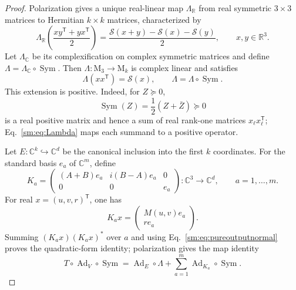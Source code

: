 \documentclass[aps,prl,reprint,superscriptaddress,nofootinbib]{revtex4-2}
\newcommand{\M}{\mathrm{M}}
\newcommand{\C}{\mathbb C}
\newcommand{\Ad}{\operatorname{Ad}}
\newcommand{\Sym}{\operatorname{Sym}}
\newcommand{\cS}{\mathcal S}
\begin{document}
\begin{proof}
Polarization gives a unique real-linear map \(\Lambda_{\mathbb R}\) from
real symmetric \(3\times3\) matrices to Hermitian \(k\times k\) matrices,
characterized by
\begin{equation*}
 \Lambda_{\mathbb R}\!\left(\frac{xy^{\mathsf T}+yx^{\mathsf T}}{2}\right)
 =\frac{\cS(x+y)-\cS(x)-\cS(y)}{2},
 \qquad x,y\in\mathbb R^3.
\end{equation*}
Let \(\Lambda_{\mathbb C}\) be its complexification on complex symmetric
matrices and define \(\Lambda=\Lambda_{\mathbb C}\circ\Sym\).  Then
\(\Lambda:\M_3\to\M_k\) is complex linear and satisfies
\begin{equation}
 \Lambda(xx^{\mathsf T})=\cS(x),\qquad
 \Lambda=\Lambda\circ\Sym.
\label{sm:eq:Lambda}
\end{equation}
This extension is positive.  Indeed, for \(Z\succeq0\),
\begin{equation}
 \Sym(Z)=\frac12(Z+\bar Z)\succeq0
\label{sm:eq:sympositive}
\end{equation}
is a real positive matrix and hence a sum of real rank-one matrices
\(x_\ell x_\ell^{\mathsf T}\); Eq.~\eqref{sm:eq:Lambda} maps each summand
to a positive operator.

Let \(E:\C^k\hookrightarrow\C^d\) be the canonical inclusion into the first
$k$ coordinates.
For the standard basis \(e_a\) of \(\C^m\), define
\begin{equation}
 K_a=\begin{pmatrix}
 (A+B)e_a&i(B-A)e_a&0\\
 0&0&e_a
 \end{pmatrix}:\C^3\to\C^d,
 \qquad a=1,\ldots,m.
\label{sm:eq:Ka}
\end{equation}
For real \(x=(u,v,r)^{\mathsf T}\), one has
\begin{equation}
 K_ax=\begin{pmatrix}M(u,v)e_a\\re_a\end{pmatrix}.
\label{sm:eq:Kax}
\end{equation}
Summing \((K_ax)(K_ax)^*\) over \(a\) and using
Eq.~\eqref{sm:eq:pureoutputnormal} proves the quadratic-form identity;
polarization gives the map identity
\begin{equation}
 T\circ\Ad_V\circ\Sym
 =\Ad_E\circ\Lambda+
 \sum_{a=1}^m\Ad_{K_a}\circ\Sym.
\label{sm:eq:mapidentity}
\end{equation}


\end{proof}
\end{document}

